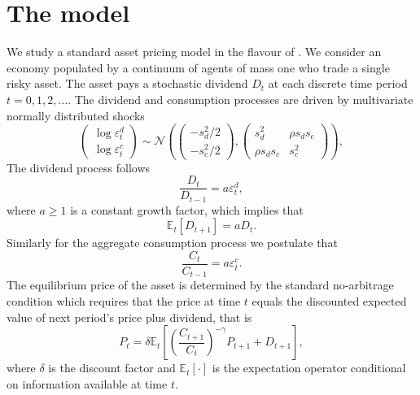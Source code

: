 \documentclass[11pt]{article}
\begin{document}
\section{The model}


We study a standard \cite{Lucas1978} asset pricing model in the flavour of \cite{Adam2016}.
We consider an economy populated by a continuum of agents of mass one who trade a single risky asset.
The asset pays a stochastic dividend $D_t$ at each discrete time period $t = 0,1,2,\ldots$.
The dividend and consumption processes are driven by multivariate normally distributed shocks
\begin{equation}
    \begin{pmatrix}
    \log \varepsilon^d_t \\
    \log \varepsilon^c_t
    \end{pmatrix} \sim \mathcal{N}\left(\begin{pmatrix}
    -s^2_d/2 \\
    -s^2_c/2
    \end{pmatrix}, \begin{pmatrix}
    s^2_d & \rho s_d s_c \\
    \rho s_d s_c & s^2_c
    \end{pmatrix}\right),
\end{equation}
The dividend process follows 
\begin{equation}
    \frac{D_t}{D_{t-1}} = a \varepsilon^d_t,
\end{equation}
where $a \geq 1$ is a constant growth factor, which implies that
\begin{equation}
    \mathbb{E}_t\left[{D_{t+1}}\right] = a D_t.
\end{equation}
Similarly for the aggregate consumption process we postulate that
\begin{equation}
    \frac{C_t}{C_{t-1}} = a \varepsilon^c_t.
\end{equation}
The equilibrium price of the asset is determined by the standard no-arbitrage condition which requires that the price at time $t$ equals the discounted expected value of next period's price plus dividend, that is
\begin{equation}\label{eq:equilibrium_price}
    P_t = \delta \mathbb{E}_t \left[{ \left(\frac{C_{t+1}}{C_t}\right)^{- \gamma} P_{t+1} + D_{t+1}}\right],
\end{equation}
where $\delta$ is the discount factor and $\mathbb{E}_t[\cdot]$ is the expectation operator conditional on information available at time $t$.
\end{document}
